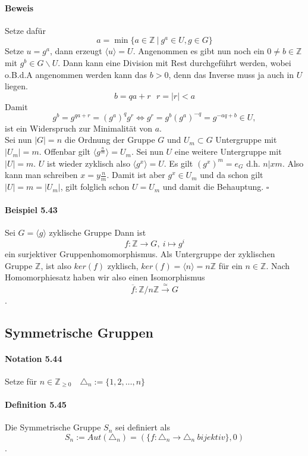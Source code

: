 \documentclass{scrartcl}
\newcommand{\Z}{\mathbb{Z}}
\begin{document}
\paragraph{Beweis}
Setze dafür
\[
  a = \min\{a \in \Z ~|~ g^a \in U, g \in G\}
\]
Setze $u = g^a$, dann erzeugt $\langle{u}\rangle = U$. Angenommen es gibt nun
noch ein $0 \neq b \in \Z$  mit $g^b \in G\backslash U$. Dann kann eine Division
mit Rest durchgeführt werden, wobei o.B.d.A angenommen werden kann das $b > 0$,
denn das Inverse muss ja auch in $U$ liegen.
\[
  b = qa + r~~~r=|r|< a
\]
Damit
\[
  g^b = g^{qa+r} = (g^a)^qg^r \iff g^r = g^b(g^a)^{-q} = g^{-aq+b} \in U, 
\]
ist ein Widerspruch zur Minimalität von $a$. \\
Sei nun $|G|=n$ die Ordnung der Gruppe $G$ und $U_m \subset G$ Untergruppe mit
$|U_m|=m$. Offenbar gilt $\langle{g^{\frac{n}{m}}}\rangle = U_m$. Sei nun $U$
eine weitere Untergruppe mit $|U|=m$. $U$ ist wieder zyklisch also
$\langle{g^x}\rangle=U$. Es gilt $(g^x)^m = e_G$ d.h. $n|xm$. Also kann man
schreiben $x=y\frac{n}{m}$. Damit ist aber $g^x \in U_m$ und da schon gilt $|U|
= m = |U_m|$, gilt folglich schon $U=U_m$ und damit die Behauptung.
\hfill $\square$
\paragraph{Beispiel 5.43}
Sei $G = \langle {g} \rangle$ zyklische Gruppe Dann ist
\[
  f: \mathbb{Z} \to G,~i \mapsto g^i
\]
ein surjektiver Gruppenhomomorphismus. Als Untergruppe der zyklischen Gruppe
$\mathbb{Z}$, ist also $ker(f)$ zyklisch, $ker(f) = \langle {n} \rangle =
n\mathbb{Z}$ für ein $n \in \mathbb{Z}$.
Nach Homomorphiesatz haben wir also einen Isomorphismus
\[
  \overline{f}:\mathbb{Z}/n\mathbb{Z} \overset{\simeq}{\to} G
\]
.
\subsection{Symmetrische Gruppen}
\label{subsec:symmetrischegruppen}

\paragraph{Notation 5.44}
Setze für $n \in \mathbb{Z}_{\geq 0}$~~$\triangle_n := \{1,2, \dots, n\}$

\paragraph{Definition 5.45}
Die Symmetrische Gruppe $S_n$ sei definiert als
\[
  S_n := Aut(\triangle_n) = (\{f: \triangle_n \to \triangle_n ~bijektiv\}, 0)
\]
.
\end{document}
